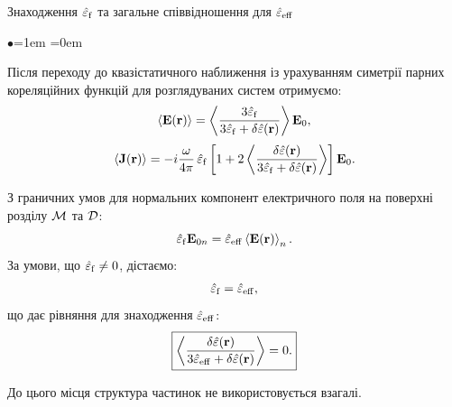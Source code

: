 \documentclass[10pt]{beamer}
\begin{document}
\begin{frame}{Знаходження $\hat{\varepsilon}_{\rm f}$ та загальне співвідношення для $\hat{\varepsilon}_{\rm eff}$}
\footnotesize

\begin{list}{$\bullet$}{\leftmargin=1em \itemindent=0em}

\item
Після переходу до квазістатичного наближення із урахуванням симетрії парних кореляційних функцій для розглядуваних систем отримуємо:
\begin{equation}\label{eq:Eaveraged}
\langle \mathbf{E} (\mathbf{r}) \rangle = \left\langle \frac{ 3
\hat{\varepsilon}_{\rm f}  }{3 \hat{\varepsilon}_{\rm f}
+ \delta\hat{\varepsilon}({\bf r})} \right\rangle \mathbf{E}_0 ,
\end{equation}
\begin{equation}\label{eq:Caveraged}
\langle \mathbf{J}  (\mathbf{r}) \rangle = -i \frac{\omega}{4\pi}
\, \hat{\varepsilon}_{\rm f}\left[1+ 2\left\langle \frac{
\delta\hat{\varepsilon}({\bf r}) }{3 \hat{\varepsilon}_{\rm f}
+ \delta\hat{\varepsilon}({\bf r})} \right\rangle \right] \mathbf{E}_0.
\end{equation}

\item
З граничних умов для нормальних компонент електричного поля на поверхні розділу $\cal{M}$ та $\cal{D}$:
\begin{equation} \label{eq:boundarycondition}
\hat{\varepsilon}_{\rm
f} {\mathbf{E}}_{0n} = \hat{\varepsilon}_{\rm eff}
\left\langle{\mathbf{E}}({\mathbf{r}})\right\rangle_n.
\end{equation}
За умови, що $\hat{\varepsilon}_{\rm f} \neq 0$, дістаємо:
\begin{equation} \label{eq:ef} 
\hat{ \varepsilon}_{\rm f} = \hat{ \varepsilon}_{\rm eff},
\end{equation}
що дає рівняння для знаходження $\hat{\varepsilon}_{\rm eff}$:
\begin{equation} \label{eq:equation}
\boxed{
\left\langle \frac{\delta\hat{\varepsilon}({\bf r}) }{3 \hat{\varepsilon}_{\rm eff} + \delta\hat{\varepsilon}({\bf r})} \right\rangle = 0.
}
\end{equation}

До цього місця структура частинок не використовується взагалі.

\end{list}

\end{frame}
\end{document}
